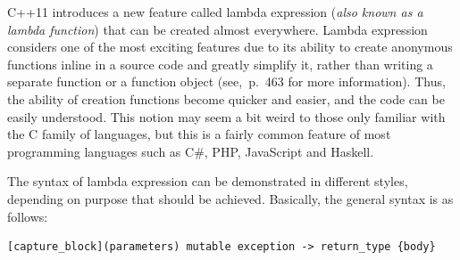 \documentclass[11pt]{report}
\begin{document}
C++11 introduces a new feature called lambda expression (\emph{also known as a lambda function}) that can be created almost everywhere. Lambda expression considers one of the most exciting features due to its ability to create anonymous functions inline in a source code and greatly simplify it, rather than writing a separate function or a function object (see\cite{Gregorie:professionalcpp},~p.~463 for more information). Thus, the ability of creation functions become quicker and easier, and the code can be easily understood. This notion may seem a bit weird to those only familiar with the C family of languages, but this is a fairly common feature of most programming languages such as C\#, PHP, JavaScript and Haskell.

The syntax of lambda expression can be demonstrated in different styles, depending on purpose that should be achieved. Basically, the general syntax is as follows:
\begin{lstlisting}
[capture_block](parameters) mutable exception -> return_type {body}
\end{lstlisting}
\end{document}
